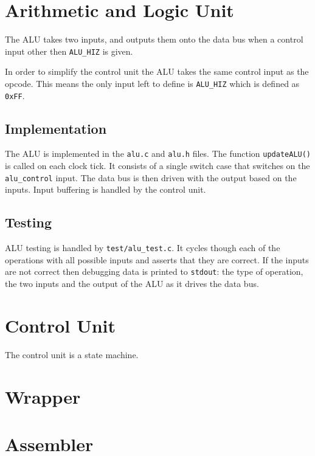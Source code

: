\documentclass[a4paper]{article}
\begin{document}
\section{Arithmetic and Logic Unit}

The ALU takes two inputs, and outputs them onto the data bus when a control input other then \texttt{ALU\_HIZ} is given.

In order to simplify the control unit the ALU takes the same control input as the opcode. This means the only input left to define is \texttt{ALU\_HIZ} which is defined as \texttt{0xFF}.

\subsection{Implementation}

The ALU is implemented in the \texttt{alu.c} and \texttt{alu.h} files. The function \texttt{updateALU()} is called on each clock tick. It consists of a single switch case that switches on the \texttt{alu\_control} input. The data bus is then driven with the output based on the inputs. Input buffering is handled by the control unit.

\subsection{Testing}

ALU testing is handled by \texttt{test/alu\_test.c}. It cycles though each of the operations with all possible inputs and asserts that they are correct. If the inputs are not correct then debugging data is printed to \texttt{stdout}: the type of operation, the two inputs and the output of the ALU as it drives the data bus.

\section{Control Unit}

The control unit is a state machine. 

\section{Wrapper}

\section{Assembler}
\end{document}
